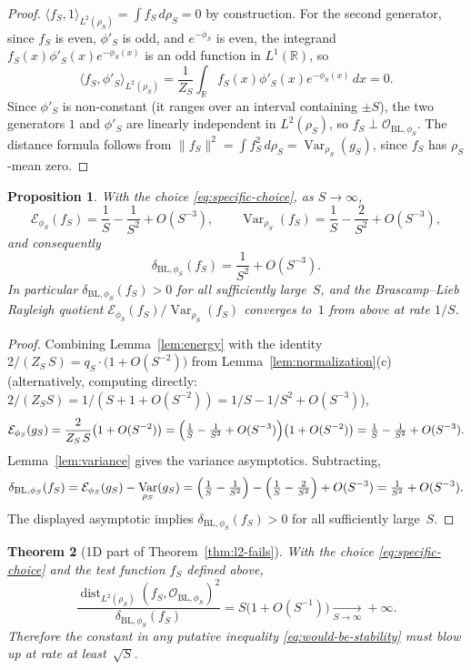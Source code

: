 \documentclass{article}
\newtheorem{theorem}{Theorem}[section]
\newtheorem{proposition}[theorem]{Proposition}
\theoremstyle{remark}
\DeclareMathOperator{\Var}{Var}
\DeclareMathOperator{\dist}{dist}
\begin{document}
\begin{proof}
$\langle f_S,1\rangle_{L^2(\rho_S)}=\int f_S\,d\rho_S=0$ by construction. For
the second generator, since $f_S$ is even, $\phi'_S$ is odd, and $e^{-\phi_S}$
is even, the integrand $f_S(x)\phi'_S(x)e^{-\phi_S(x)}$ is an odd function in
$L^1(\mathbb R)$, so
\[
  \langle f_S,\phi'_S\rangle_{L^2(\rho_S)}
  =\frac{1}{Z_S}\int_{\mathbb R}f_S(x)\phi'_S(x)e^{-\phi_S(x)}\,dx
  =0.
\]
Since $\phi'_S$ is non-constant (it ranges over an interval containing
$\pm S$), the two generators $1$ and $\phi'_S$ are linearly independent in
$L^2(\rho_S)$, so $f_S\perp\mathcal O_{\mathrm{BL},\phi_S}$. The distance
formula follows from $\|f_S\|^2=\int f_S^2\,d\rho_S=\Var_{\rho_S}(g_S)$,
since $f_S$ has $\rho_S$-mean zero.
\end{proof}

\begin{proposition}\label{prop:asymptotics}
With the choice \eqref{eq:specific-choice}, as $S\to\infty$,
\[
  \mathcal E_{\phi_S}(f_S) = \frac{1}{S}-\frac{1}{S^2}+O(S^{-3}),
  \qquad
  \Var_{\rho_S}(f_S) = \frac{1}{S}-\frac{2}{S^2}+O(S^{-3}),
\]
and consequently
\[
  \delta_{\mathrm{BL},\phi_S}(f_S)
  = \frac{1}{S^2}+O(S^{-3}).
\]
In particular $\delta_{\mathrm{BL},\phi_S}(f_S)>0$ for all sufficiently
large~$S$, and the Brascamp--Lieb Rayleigh quotient
$\mathcal E_{\phi_S}(f_S)/\Var_{\rho_S}(f_S)$ converges to~$1$ from above at
rate $1/S$.
\end{proposition}

\begin{proof}
Combining Lemma~\ref{lem:energy} with the identity
$2/(Z_S\,S)=q_S\cdot\bigl(1+O(S^{-2})\bigr)$ from
Lemma~\ref{lem:normalization}(c) (alternatively, computing directly:
$2/(Z_S S)=1/(S+1+O(S^{-2}))=1/S-1/S^2+O(S^{-3})$),
\[
  \mathcal E_{\phi_S}(g_S)
  =\frac{2}{Z_S\,S}\bigl(1+O(S^{-2})\bigr)
  =\Bigl(\tfrac{1}{S}-\tfrac{1}{S^2}+O(S^{-3})\Bigr)\bigl(1+O(S^{-2})\bigr)
  =\tfrac{1}{S}-\tfrac{1}{S^2}+O(S^{-3}).
\]
Lemma~\ref{lem:variance} gives the variance asymptotics. Subtracting,
\[
  \delta_{\mathrm{BL},\phi_S}(f_S)
  =\mathcal E_{\phi_S}(g_S)-\Var_{\rho_S}(g_S)
  =\Bigl(\tfrac{1}{S}-\tfrac{1}{S^2}\Bigr)
   -\Bigl(\tfrac{1}{S}-\tfrac{2}{S^2}\Bigr)+O(S^{-3})
  =\tfrac{1}{S^2}+O(S^{-3}).
\]
The displayed asymptotic implies $\delta_{\mathrm{BL},\phi_S}(f_S)>0$ for all
sufficiently large~$S$.
\end{proof}

\begin{theorem}[1D part of Theorem~\ref{thm:l2-fails}]\label{thm:1d}
With the choice \eqref{eq:specific-choice} and the test function $f_S$
defined above,
\[
  \frac{\dist_{L^2(\rho_S)}(f_S,\mathcal O_{\mathrm{BL},\phi_S})^2}
       {\delta_{\mathrm{BL},\phi_S}(f_S)}
  =S\bigl(1+O(S^{-1})\bigr)\xrightarrow[S\to\infty]{}+\infty.
\]
Therefore the constant in any putative inequality
\eqref{eq:would-be-stability} must blow up at rate at least~$\sqrt S$.
\end{theorem}
\end{document}
